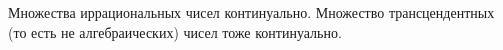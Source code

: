 
    Множества иррациональных чисел континуально. Множество трансцендентных (то есть не алгебраических) чисел тоже континуально.

